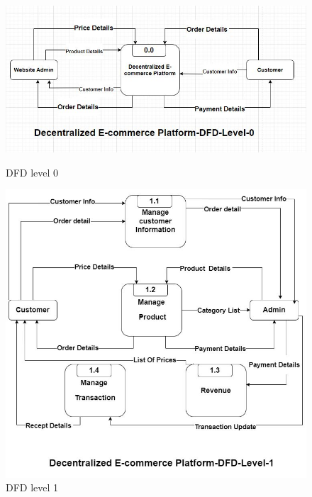 \documentclass{report}
\begin{document}
\newpage
\begin{figure}[h]
    \centering
    
    \begin{minipage}{0.45\textwidth}
    \centering
    \includegraphics[width=1\textwidth]{dfd/dfd_level_0.jpeg}
    \caption{DFD level 0}
    \label{fig:1}
    \end{minipage}
    \hfill
    \begin{minipage}{0.45\textwidth}
    \centering
    \includegraphics[width=1\textwidth]{dfd/dfd_level1.jpeg}
    \caption{DFD level 1}
    \label{fig:2}
    \end{minipage}  
\end{figure}
\end{document}
